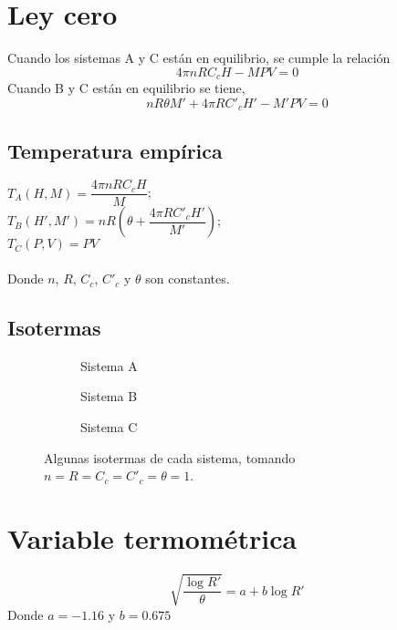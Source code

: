 \documentclass[12pt]{article}
\begin{document}
\maketitle

\section{Ley cero}
Cuando los sistemas A y C están en equilibrio, se cumple la relación
\begin{equation}
4\pi nRC_{c}H-MPV=0  
\end{equation}
Cuando B y C están en equilibrio se tiene,
\begin{equation}
nR\theta M'+4\pi RC'_{c}H'-M'PV=0
\end{equation}
\subsection{Temperatura empírica}
\begin{center}
  $T_A(H,M)=\dfrac{4\pi nRC_cH}{M}$; \\ 
  $T_B(H',M')=nR(\theta+\dfrac{4\pi RC'_cH'}{M'})$;  \\
  $T_C(P,V)=PV$
\end{center}
\paragraph{}
Donde $n$, $R$, $C_c$, $C'_c $ y $\theta$ son constantes.
\subsection{Isotermas}

\begin{figure}[H]
  \centering
  \begin{subfigure}[b]{0.3\textwidth}
    \scalebox{.4}{}
    \caption{Sistema A}
  \end{subfigure}
  \begin{subfigure}[b]{0.3\textwidth}
    \scalebox{.4}{}
    \caption{Sistema B}
  \end{subfigure}
  \begin{subfigure}[b]{0.3\textwidth}
    \scalebox{.4}{}
    \caption{Sistema C}
  \end{subfigure}
  \caption{Algunas isotermas de cada sistema, tomando $n=R=C_c=C'_c=\theta =1$.}
\end{figure}
      
\section{Variable termométrica}
\begin{equation} \label{res}
\sqrt{\dfrac{\log{R'}}{\theta}}=a+b \log{R'}  
\end{equation}
Donde $a=-1.16$ y $b=0.675$
\end{document}
